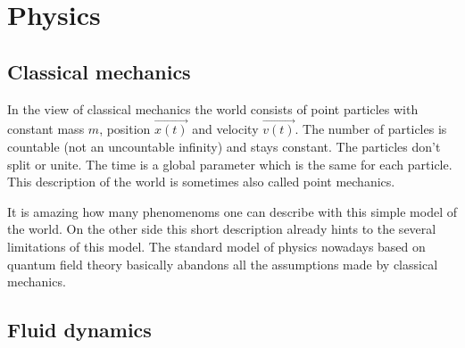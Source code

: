 \part{Physics}
\chapter{Classical mechanics}
In the view of classical mechanics the world consists of point particles with constant mass $m$, 
position $\vec{x(t)}$ and velocity $\vec{v(t)}$. The number of particles is countable 
(not an uncountable infinity) and stays constant. The particles don't split or unite. 
The time is a global parameter which is the same for each particle. This description 
of the world is sometimes also called point mechanics.

It is amazing how many phenomenoms one can describe with this simple model of the world.
On the other side this short description already hints to the several limitations of this model. 
The standard model of physics nowadays based on quantum field theory basically abandons
all the assumptions made by classical mechanics. 

\chapter{Fluid dynamics}

